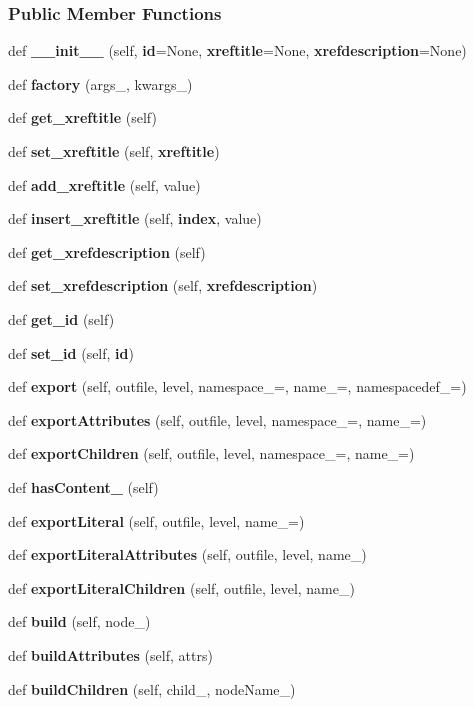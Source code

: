 \subsubsection*{Public Member Functions}
\begin{DoxyCompactItemize}
\item 
def {\bf \+\_\+\+\_\+init\+\_\+\+\_\+} (self, {\bf id}=None, {\bf xreftitle}=None, {\bf xrefdescription}=None)
\item 
def {\bf factory} (args\+\_\+, kwargs\+\_\+)
\item 
def {\bf get\+\_\+xreftitle} (self)
\item 
def {\bf set\+\_\+xreftitle} (self, {\bf xreftitle})
\item 
def {\bf add\+\_\+xreftitle} (self, value)
\item 
def {\bf insert\+\_\+xreftitle} (self, {\bf index}, value)
\item 
def {\bf get\+\_\+xrefdescription} (self)
\item 
def {\bf set\+\_\+xrefdescription} (self, {\bf xrefdescription})
\item 
def {\bf get\+\_\+id} (self)
\item 
def {\bf set\+\_\+id} (self, {\bf id})
\item 
def {\bf export} (self, outfile, level, namespace\+\_\+=\textquotesingle{}\textquotesingle{}, name\+\_\+=\textquotesingle{}, namespacedef\+\_\+=\textquotesingle{}\textquotesingle{})
\item 
def {\bf export\+Attributes} (self, outfile, level, namespace\+\_\+=\textquotesingle{}\textquotesingle{}, name\+\_\+=\textquotesingle{})
\item 
def {\bf export\+Children} (self, outfile, level, namespace\+\_\+=\textquotesingle{}\textquotesingle{}, name\+\_\+=\textquotesingle{})
\item 
def {\bf has\+Content\+\_\+} (self)
\item 
def {\bf export\+Literal} (self, outfile, level, name\+\_\+=\textquotesingle{})
\item 
def {\bf export\+Literal\+Attributes} (self, outfile, level, name\+\_\+)
\item 
def {\bf export\+Literal\+Children} (self, outfile, level, name\+\_\+)
\item 
def {\bf build} (self, node\+\_\+)
\item 
def {\bf build\+Attributes} (self, attrs)
\item 
def {\bf build\+Children} (self, child\+\_\+, node\+Name\+\_\+)
\end{DoxyCompactItemize}
